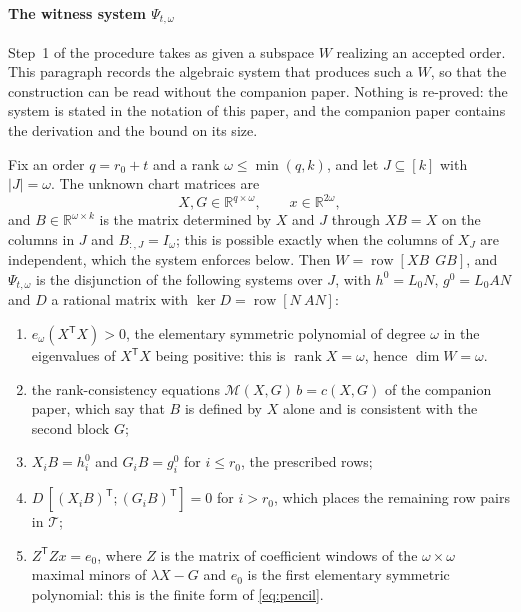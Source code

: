 ﻿\documentclass[journal]{IEEEtran}
\theoremstyle{plainn}
\theoremstyle{remark}
\begin{document}
\paragraph*{The witness system $\Psi_{t,\omega}$}\label{sec:psi}
Step~1 of the procedure takes as given a subspace $W$ realizing an accepted order. This paragraph
records the algebraic system that produces such a $W$, so that the construction can be read without the
companion paper. Nothing is re-proved: the system is stated in the notation of this paper, and the
companion paper contains the derivation and the bound on its size.

Fix an order $q=r_0+t$ and a rank $\omega\le\min(q,k)$, and let $J\subseteq[k]$ with $|J|=\omega$.
The unknown chart matrices are
\begin{equation*}
X,G\in\mathbb R^{q\times\omega},\qquad x\in\mathbb R^{2\omega},
\end{equation*}
and $B\in\mathbb R^{\omega\times k}$ is the matrix determined by $X$ and $J$ through $XB=X$ on the
columns in $J$ and $B_{:,J}=I_\omega$; this is possible exactly when the columns of $X_J$ are
independent, which the system enforces below. Then $W=\operatorname{row}[XB\ \ GB]$, and
$\Psi_{t,\omega}$ is the disjunction of the following systems over $J$, with $h^0=L_0N$,
$g^0=L_0AN$ and $D$ a rational matrix with $\ker D=\operatorname{row}[N\ AN]$:

\begin{enumerate}\itemsep2pt
\item $e_\omega(X^{\mathsf T}X)>0$, the elementary symmetric polynomial of degree $\omega$ in the
eigenvalues of $X^{\mathsf T}X$ being positive: this is $\operatorname{rank}X=\omega$, hence
$\dim W=\omega$.
\item the rank-consistency equations $\mathcal M(X,G)\,b=c(X,G)$ of the companion paper, which say
that $B$ is defined by $X$ alone and is consistent with the second block $G$;
\item $X_iB=h_i^0$ and $G_iB=g_i^0$ for $i\le r_0$, the prescribed rows;
\item $D\,[(X_iB)^{\mathsf T};(G_iB)^{\mathsf T}]=0$ for $i>r_0$, which places the remaining row pairs
in $\mathcal T$;
\item $Z^{\mathsf T}Zx=e_0$, where $Z$ is the matrix of coefficient windows of the $\omega\times\omega$
maximal minors of $\lambda X-G$ and $e_0$ is the first elementary symmetric polynomial: this is the
finite form of \eqref{eq:pencil}.
\end{enumerate}
\end{document}
